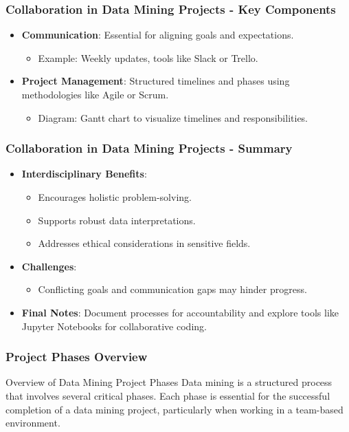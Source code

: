 \documentclass[aspectratio=169]{beamer}
\begin{document}
\begin{frame}[fragile]
    \frametitle{Collaboration in Data Mining Projects - Key Components}
    \begin{itemize}
        \item \textbf{Communication}: Essential for aligning goals and expectations.
        \begin{itemize}
            \item Example: Weekly updates, tools like Slack or Trello.
        \end{itemize}
        \item \textbf{Project Management}: Structured timelines and phases using methodologies like Agile or Scrum.
        \begin{itemize}
            \item Diagram: Gantt chart to visualize timelines and responsibilities.
        \end{itemize}
    \end{itemize}
\end{frame}

\begin{frame}[fragile]
    \frametitle{Collaboration in Data Mining Projects - Summary}
    \begin{itemize}
        \item \textbf{Interdisciplinary Benefits}:
        \begin{itemize}
            \item Encourages holistic problem-solving.
            \item Supports robust data interpretations.
            \item Addresses ethical considerations in sensitive fields.
        \end{itemize}
        \item \textbf{Challenges}:
        \begin{itemize}
            \item Conflicting goals and communication gaps may hinder progress.
        \end{itemize}
        \item \textbf{Final Notes}: Document processes for accountability and explore tools like Jupyter Notebooks for collaborative coding.
    \end{itemize}
\end{frame}

\begin{frame}[fragile]
    \frametitle{Project Phases Overview}
    \begin{block}{Overview of Data Mining Project Phases}
        Data mining is a structured process that involves several critical phases. Each phase is essential for the successful completion of a data mining project, particularly when working in a team-based environment.
    \end{block}
\end{frame}
\end{document}
